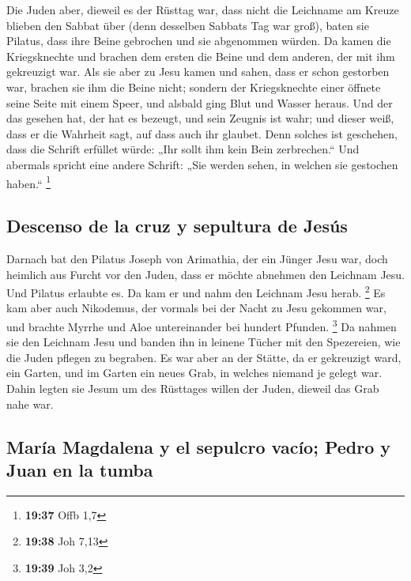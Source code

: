  Die Juden aber, dieweil es der Rüsttag war, dass nicht
die Leichname am Kreuze blieben den Sabbat über (denn desselben Sabbats
Tag war groß), baten sie Pilatus, dass ihre Beine gebrochen und sie
abgenommen würden.  Da kamen die Kriegsknechte und
brachen dem ersten die Beine und dem anderen, der mit ihm gekreuzigt
war.  Als sie aber zu Jesu kamen und sahen, dass er schon
gestorben war, brachen sie ihm die Beine nicht;  sondern
der Kriegsknechte einer öffnete seine Seite mit einem Speer, und alsbald
ging Blut und Wasser heraus.  Und der das gesehen hat,
der hat es bezeugt, und sein Zeugnis ist wahr; und dieser weiß, dass er
die Wahrheit sagt, auf dass auch ihr glaubet.  Denn
solches ist geschehen, dass die Schrift erfüllet würde: „Ihr sollt ihm
kein Bein zerbrechen.``  Und abermals spricht eine andere
Schrift: „Sie werden sehen, in welchen sie gestochen haben.``
\footnote{\textbf{19:37} Offb 1,7}

\hypertarget{descenso-de-la-cruz-y-sepultura-de-jesuxfas}{%
\subsection{Descenso de la cruz y sepultura de
Jesús}\label{descenso-de-la-cruz-y-sepultura-de-jesuxfas}}

 Darnach bat den Pilatus Joseph von Arimathia, der ein
Jünger Jesu war, doch heimlich aus Furcht vor den Juden, dass er möchte
abnehmen den Leichnam Jesu. Und Pilatus erlaubte es. Da kam er und nahm
den Leichnam Jesu herab. \footnote{\textbf{19:38} Joh 7,13}
 Es kam aber auch Nikodemus, der vormals bei der Nacht zu
Jesu gekommen war, und brachte Myrrhe und Aloe untereinander bei hundert
Pfunden. \footnote{\textbf{19:39} Joh 3,2}  Da nahmen sie
den Leichnam Jesu und banden ihn in leinene Tücher mit den Spezereien,
wie die Juden pflegen zu begraben.  Es war aber an der
Stätte, da er gekreuzigt ward, ein Garten, und im Garten ein neues Grab,
in welches niemand je gelegt war.  Dahin legten sie Jesum
um des Rüsttages willen der Juden, dieweil das Grab nahe war.

\hypertarget{maruxeda-magdalena-y-el-sepulcro-vacuxedo-pedro-y-juan-en-la-tumba}{%
\subsection{María Magdalena y el sepulcro vacío; Pedro y Juan en la
tumba}\label{maruxeda-magdalena-y-el-sepulcro-vacuxedo-pedro-y-juan-en-la-tumba}}

